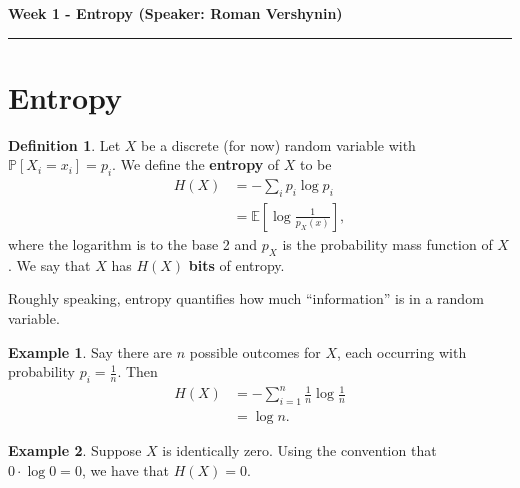 \documentclass[11pt,letterpaper]{article}
\newcommand{\E}{\mathbb{E}}
\newcommand{\Prob}{\mathbb{P}}
\theoremstyle{plain}
\theoremstyle{definition}
\newtheorem{definition}{Definition}
\newtheorem{example}{Example}
\begin{document}
\begin{center}
{\bf \Large Week 1 - Entropy (Speaker: Roman Vershynin)}
\vspace{0.2cm}
\hrule
\end{center}
\section{Entropy}
\begin{definition}
	Let $X$ be a discrete (for now) random variable with $\Prob[X_i = x_i] = p_i$. We define the \textbf{entropy} of $X$ to be
	\begin{align*}
	H(X) &= -\sum_ip_i\log p_i\\
	&= \E\left[\log \frac{1}{p_X(x)}\right],
	\end{align*}
	where the logarithm is to the base 2 and $p_X$ is the probability mass function of $X$. We say that $X$ has $H(X)$ \textbf{bits} of entropy.
\end{definition}
\noindent Roughly speaking, entropy quantifies how much ``information'' is in a random variable.

\begin{example}
	Say there are $n$ possible outcomes for $X$, each occurring with probability $p_i = \frac{1}{n}$. Then
	\begin{align*}
		H(X) &= -\sum_{i=1}^n\frac{1}{n}\log \frac{1}{n}\\
		&= \log n.
	\end{align*}
\end{example}

\begin{example}
	Suppose $X$ is identically zero. Using the convention that $0\cdot \log 0 = 0$, we have that $H(X) = 0$.
\end{example}
\end{document}
